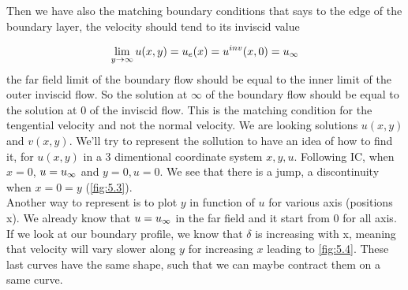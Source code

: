 	Then we have also the matching boundary conditions that says to the edge of the boundary layer, the velocity should tend to its inviscid value
	
	\begin{equation}
		\lim _{y\rightarrow \infty} u(x,y) = u_e(x) = u^{inv}(x,0) = \uinf 
	\end{equation}
	the far field limit of the boundary flow should be equal to the inner limit of the outer inviscid flow. So the solution at $\infty$ of the boundary flow should be equal to the solution at 0 of the inviscid flow. This is the matching condition for the tengential velocity and not the normal velocity. We are looking solutions $u(x,y)$ and $v(x,y)$. We'll try to represent the sollution to have an idea of how to find it, for $u(x,y)$ in a 3 dimentional coordinate system $x, y, u$. Following IC, when $x=0$, $u = \uinf$ and $y = 0, u=0$. We see that there is a jump, a discontinuity when $x=0=y$ (\autoref{fig:5.3}).\\
	
	 Another way to represent is to plot $y$ in function of $u$ for various axis (positions x). We already know that $u = \uinf$ in the far field and it start from 0 for all axis. If we look at our boundary profile, we know that $\delta$ is increasing with x, meaning that velocity will vary slower along $y$ for increasing $x$ leading to \autoref{fig:5.4}. These last curves have the same shape, such that we can maybe contract them on a same curve. 
	 
